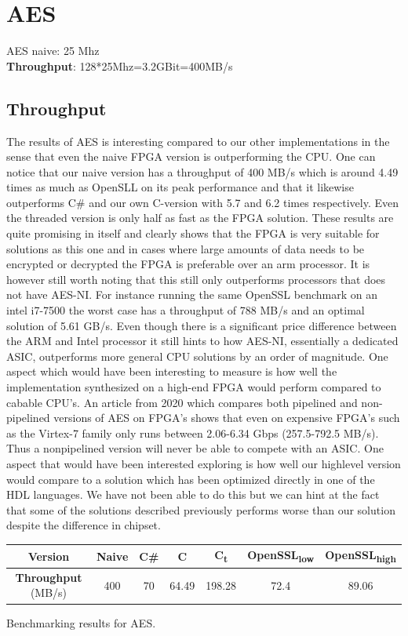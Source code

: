 \documentclass[a4paper, openany]{book}
\begin{document}
\section{AES}
\label{sec:orgb635fb3}
AES naive: 25 Mhz\\
\textbf{Throughput}: 128*25Mhz=3.2GBit=400MB/s
\subsection{Throughput}
\label{sec:orgaa9d478}
The results of AES is interesting compared to our other implementations in the sense that even the naive FPGA version is outperforming the CPU. One can notice that our naive version has a throughput of 400 MB/s which is around 4.49 times as much as OpenSLL on its peak performance and that it likewise outperforms C\# and our own C-version with 5.7 and 6.2 times respectively. Even the threaded version is only half as fast as the FPGA solution. These results are quite promising in itself and clearly shows that the FPGA is very suitable for solutions as this one and in cases where large amounts of data needs to be encrypted or decrypted the FPGA is preferable over an arm processor. It is however still worth noting that this still only outperforms processors that does not have AES-NI. For instance running the same OpenSSL benchmark on an intel i7-7500 the worst case has a throughput of 788 MB/s and an optimal solution of 5.61 GB/s. Even though there is a significant price difference between the ARM and Intel processor it still hints to how AES-NI, essentially a dedicated ASIC, outperforms more general CPU solutions by an order of magnitude. One aspect which would have been interesting to measure is how well the implementation synthesized on a high-end FPGA would perform compared to cabable CPU's. An article from 2020 which compares both pipelined and non-pipelined versions of AES on FPGA's shows that even on expensive FPGA's such as the Virtex-7 family only runs between 2.06-6.34 Gbps (257.5-792.5 MB/s)\cite{FPGA_AES}. Thus a nonpipelined version will never be able to compete with an ASIC. One aspect that would have been interested exploring is how well our highlevel version would compare to a solution which has been optimized directly in one of the HDL languages. We have not been able to do this but we can hint at the fact that some of the solutions described previously performs worse than our solution despite the difference in chipset.
\begin{table}[htbp]
\centering
\begin{tabular}{|c|c|c|c|c|c|c|}
\hline
\textbf{Version} & Naive & C\# & C & C\textsubscript{t} & OpenSSL\textsubscript{low} & OpenSSL\textsubscript{high}\\
\hline
\textbf{Throughput} (MB/s) & 400 & 70 & 64.49 & 198.28 & 72.4 & 89.06\\
\hline
\end{tabular}
Benchmarking results for AES.

\end{table}
\end{document}
